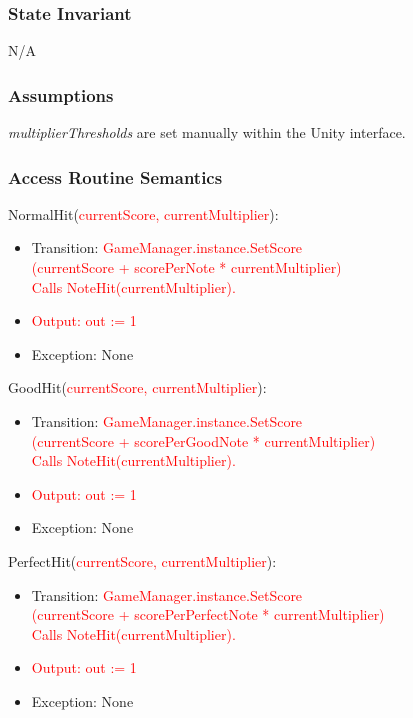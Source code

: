 \documentclass[12pt]{article}
\begin{document}
\subsubsection {State Invariant}
N/A

\subsubsection {Assumptions}
\textit{multiplierThresholds} are set manually within the Unity interface.

\subsubsection {Access Routine Semantics}

\noindent NormalHit(\textcolor{red}{currentScore, currentMultiplier}):
\begin{itemize}
    \item Transition: \textcolor{red}{GameManager.instance.SetScore\\(currentScore + scorePerNote * currentMultiplier)\\Calls NoteHit(currentMultiplier).}\\
    \item \textcolor{red}{Output: out := 1}
    \item Exception: None
\end{itemize}

\noindent GoodHit(\textcolor{red}{currentScore, currentMultiplier}):
\begin{itemize}
    \item Transition: \textcolor{red}{GameManager.instance.SetScore\\(currentScore + scorePerGoodNote * currentMultiplier)\\Calls NoteHit(currentMultiplier).}
    \item \textcolor{red}{Output: out := 1}
    \item Exception: None
\end{itemize}

\noindent PerfectHit(\textcolor{red}{currentScore, currentMultiplier}):
\begin{itemize}
    \item Transition: \textcolor{red}{GameManager.instance.SetScore\\(currentScore + scorePerPerfectNote * currentMultiplier)\\Calls NoteHit(currentMultiplier).}
    \item \textcolor{red}{Output: out := 1}
    \item Exception: None
\end{itemize}
\end{document}

